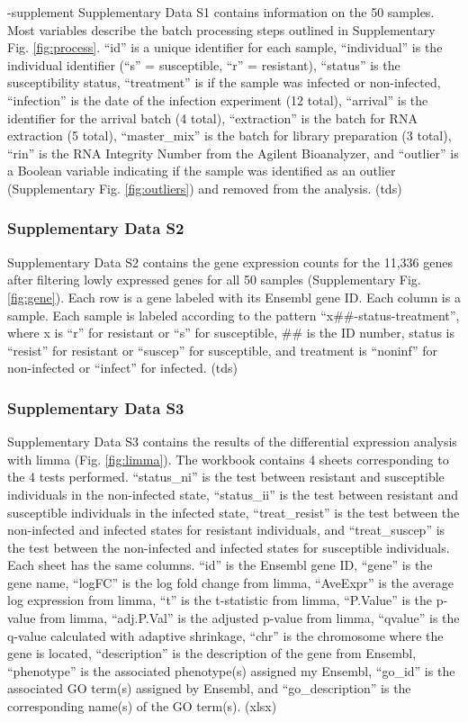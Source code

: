 \documentclass[fleqn,10pt]{wlscirep}
\begin{document}
\begin{filecontents}{\jobname-supplement}
Supplementary Data S1 contains information on the 50 samples. Most
variables describe the batch processing steps outlined in
Supplementary Fig. \ref{fig:process}. “id” is a unique identifier for
each sample, “individual” is the individual identifier (“s” =
susceptible, “r” = resistant), “status” is the susceptibility status,
“treatment” is if the sample was infected or non-infected, “infection”
is the date of the infection experiment (12 total), “arrival” is the
identifier for the arrival batch (4 total), “extraction” is the batch
for RNA extraction (5 total), “master\_mix” is the batch for library
preparation (3 total), “rin” is the RNA Integrity Number from the
Agilent Bioanalyzer, and “outlier” is a Boolean variable indicating if
the sample was identified as an outlier (Supplementary Fig.
\ref{fig:outliers}) and removed from the analysis. (tds)
\subsubsection*{Supplementary Data S2}

Supplementary Data S2 contains the gene expression counts for the
11,336 genes after filtering lowly expressed genes for all 50 samples
(Supplementary Fig. \ref{fig:gene}). Each row is a gene labeled with
its Ensembl gene ID. Each column is a sample. Each sample is labeled
according to the pattern “x\#\#-status-treatment”, where x is “r” for
resistant or “s” for susceptible, \#\# is the ID number, status is
“resist” for resistant or “suscep” for susceptible, and treatment is
“noninf” for non-infected or “infect” for infected. (tds)
\subsubsection*{Supplementary Data S3}

Supplementary Data S3 contains the results of the differential
expression analysis with limma (Fig. \ref{fig:limma}). The workbook
contains 4 sheets corresponding to the 4 tests performed. “status\_ni”
is the test between resistant and susceptible individuals in the
non-infected state, “status\_ii” is the test between resistant and
susceptible individuals in the infected state, “treat\_resist” is the
test between the non-infected and infected states for resistant
individuals, and “treat\_suscep” is the test between the non-infected
and infected states for susceptible individuals. Each sheet has the
same columns. “id” is the Ensembl gene ID, “gene” is the gene name,
“logFC” is the log fold change from limma, “AveExpr” is the average
log expression from limma, “t” is the t-statistic from limma,
“P.Value” is the p-value from limma, “adj.P.Val” is the adjusted
p-value from limma, “qvalue” is the q-value calculated with adaptive
shrinkage, “chr” is the chromosome where the gene is located,
“description” is the description of the gene from Ensembl, “phenotype”
is the associated phenotype(s) assigned my Ensembl, “go\_id” is the
associated GO term(s) assigned by Ensembl, and “go\_description” is
the corresponding name(s) of the GO term(s). (xlsx)

\end{filecontents}
\end{document}
